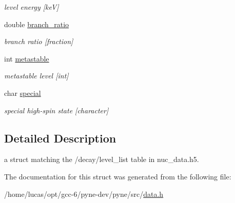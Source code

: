 \begin{DoxyCompactItemize}
\begin{DoxyCompactList}\small\item\em level energy \mbox{[}keV\mbox{]} \end{DoxyCompactList}\item 
double \hyperlink{structpyne_1_1level__data_a5ce97c540e0ce558156e5a43510a4633}{branch\+\_\+ratio}\hypertarget{structpyne_1_1level__data_a5ce97c540e0ce558156e5a43510a4633}{}\label{structpyne_1_1level__data_a5ce97c540e0ce558156e5a43510a4633}

\begin{DoxyCompactList}\small\item\em branch ratio \mbox{[}fraction\mbox{]} \end{DoxyCompactList}\item 
int \hyperlink{structpyne_1_1level__data_a7a71068eed39597f007cc6624727e954}{metastable}\hypertarget{structpyne_1_1level__data_a7a71068eed39597f007cc6624727e954}{}\label{structpyne_1_1level__data_a7a71068eed39597f007cc6624727e954}

\begin{DoxyCompactList}\small\item\em metastable level \mbox{[}int\mbox{]} \end{DoxyCompactList}\item 
char \hyperlink{structpyne_1_1level__data_acabc31aa71741dbc2ea5485ca51da0d6}{special}\hypertarget{structpyne_1_1level__data_acabc31aa71741dbc2ea5485ca51da0d6}{}\label{structpyne_1_1level__data_acabc31aa71741dbc2ea5485ca51da0d6}

\begin{DoxyCompactList}\small\item\em special high-\/spin state \mbox{[}character\mbox{]} \end{DoxyCompactList}\end{DoxyCompactItemize}


\subsection{Detailed Description}
a struct matching the \textquotesingle{}/decay/level\+\_\+list\textquotesingle{} table in nuc\+\_\+data.\+h5. 

The documentation for this struct was generated from the following file\+:\begin{DoxyCompactItemize}
\item 
/home/lucas/opt/gcc-\/6/pyne-\/dev/pyne/src/\hyperlink{data_8h}{data.\+h}\end{DoxyCompactItemize}
